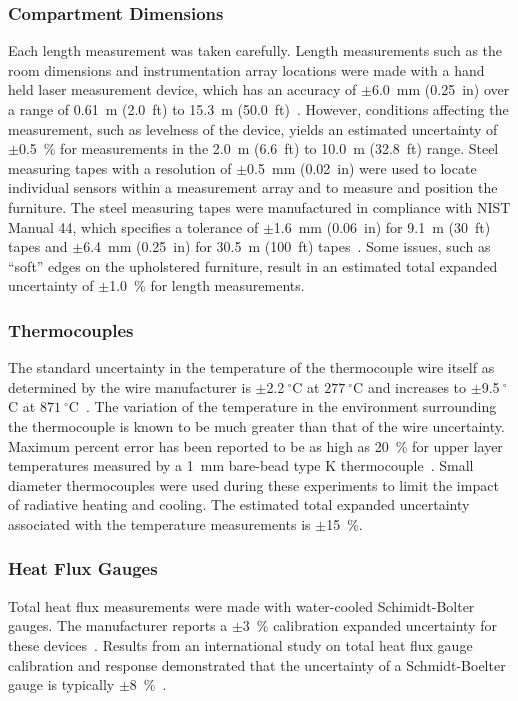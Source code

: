 \documentclass[12pt,oneside]{book}
\begin{document}
\subsubsection{Compartment Dimensions}
Each length measurement was taken carefully. Length measurements such as the room dimensions and instrumentation array locations were made with a hand held laser measurement device, which has an accuracy of $\pm$6.0~mm (0.25~in) over a range of 0.61~m (2.0~ft) to 15.3~m (50.0~ft)~\cite{StanleyTools}. However, conditions affecting the measurement, such as levelness of the device, yields an estimated uncertainty of $\pm$0.5~\% for measurements in the 2.0~m (6.6~ft) to 10.0~m (32.8~ft) range. Steel measuring tapes with a resolution of $\pm$0.5~mm (0.02~in) were used to locate individual sensors within a measurement array and to measure and position the furniture. The steel measuring tapes were manufactured in compliance with NIST Manual 44, which specifies a tolerance of $\pm$1.6~mm (0.06~in) for 9.1~m (30~ft) tapes and $\pm$6.4~mm (0.25~in) for 30.5~m (100~ft) tapes~\cite{Butcher:2012}. Some issues, such as ``soft'' edges on the upholstered furniture, result in an estimated total expanded uncertainty of $\pm$1.0~\% for length measurements.

\subsubsection{Thermocouples}
The standard uncertainty in the temperature of the thermocouple wire itself as determined by the wire manufacturer is $\pm$2.2$~^{\circ}$C at $277~^{\circ}$C and increases to $\pm$9.5$~^{\circ}$C at $871~^{\circ}$C~\cite{Omega:2004}. The variation of the temperature in the environment surrounding the thermocouple is known to be much greater than that of the wire uncertainty. Maximum percent error has been reported to be as high as 20~\% for upper layer temperatures measured by a 1~mm bare-bead type K thermocouple~\cite{Blevins:1999,Pitts:2003}. Small diameter thermocouples were used during these experiments to limit the impact of radiative heating and cooling. The estimated total expanded uncertainty associated with the temperature measurements is $\pm$15~\%.

\subsubsection{Heat Flux Gauges}
Total heat flux measurements were made with water-cooled Schimidt-Bolter gauges. The manufacturer reports a $\pm$3~\% calibration expanded uncertainty for these devices~\cite{Medtherm:2003}. Results from an international study on total heat flux gauge calibration and response demonstrated that the uncertainty of a Schmidt-Boelter gauge is typically $\pm$8~\%~\cite{Pitts:2006}.
\end{document}
